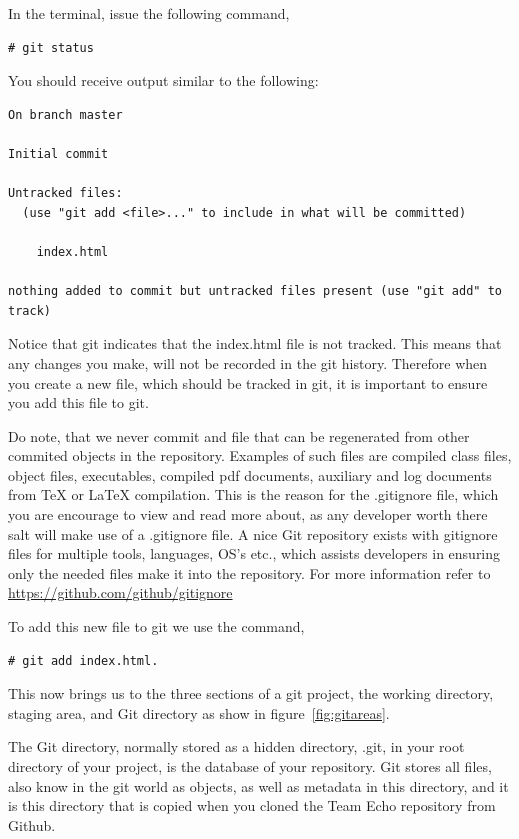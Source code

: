 \documentclass[a4paper,10pt]{article}
\begin{document}
In the terminal, issue the following command, 
\begin{lstlisting}[style=TerminalStyle]
# git status
\end{lstlisting}

You should receive output similar to the following:
\begin{lstlisting}[style=OutputStyle]
On branch master

Initial commit

Untracked files:
  (use "git add <file>..." to include in what will be committed)

	index.html

nothing added to commit but untracked files present (use "git add" to track)
\end{lstlisting}

Notice that git indicates that the index.html file is not tracked. This means that any changes you make, will not be recorded in the git history. Therefore when you create a new file, which should be tracked in git, it is important to ensure you add this file to git. 

Do note, that we never commit and file that can be regenerated from other commited objects in the repository. Examples of such files are compiled class files, object files, executables, compiled pdf documents, auxiliary and log documents from \TeX{} or \LaTeX{} compilation. This is the reason for the .gitignore file, which you are encourage to view and read more about, as any developer worth there salt will make use of a .gitignore file. A nice Git repository exists with gitignore files for multiple tools, languages, OS's etc., which assists developers in ensuring only the needed files make it into the repository. For more information refer to \url{https://github.com/github/gitignore}

To add this new file to git we use the command, 
\begin{lstlisting}[style=TerminalStyle]
# git add index.html. 
\end{lstlisting}

This now brings us to the three sections of a git project, the working directory, staging area, and Git directory as show in figure~\ref{fig:gitareas}.

The Git directory, normally stored as a hidden directory, .git, in your root directory of your project, is the database of your repository. Git stores all files, also know in the git world as objects, as well as metadata in this directory, and it is this directory that is copied when you cloned the Team Echo repository from Github.
\end{document}
